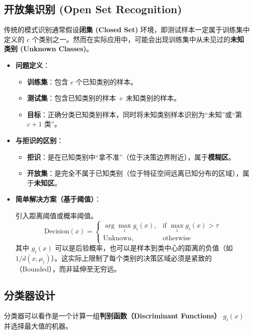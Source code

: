 \documentclass[a4paper, 11pt]{ctexart}
\begin{document}
\subsection{开放集识别 (Open Set Recognition)}
传统的模式识别通常假设\textbf{闭集 (Closed Set)} 环境，即测试样本一定属于训练集中定义的 $c$ 个类别之一。然而在实际应用中，可能会出现训练集中从未见过的\textbf{未知类别 (Unknown Classes)}。

\begin{itemize}
    \item \textbf{问题定义}：
    \begin{itemize}
        \item \textbf{训练集}：包含 $c$ 个已知类别的样本。
        \item \textbf{测试集}：包含已知类别的样本 + 未知类别的样本。
        \item \textbf{目标}：正确分类已知类别样本，同时将未知类别样本识别为“未知”或“第 $c+1$ 类”。
    \end{itemize}
    
    \item \textbf{与拒识的区别}：
    \begin{itemize}
        \item \textbf{拒识}：是在已知类别中“拿不准”（位于决策边界附近），属于\textbf{模糊区}。
        \item \textbf{开放集}：是完全不属于已知类别（位于特征空间远离已知分布的区域），属于\textbf{未知区}。
    \end{itemize}

    \item \textbf{简单解决方案（基于阈值）}：
    
    引入距离阈值或概率阈值。
    \begin{equation}
        \text{Decision}(x) = \begin{cases}
        \arg \max_i g_i(x), & \text{if } \max_i g_i(x) > \tau \\
        \text{Unknown}, & \text{otherwise}
        \end{cases}
    \end{equation}
    其中 $g_i(x)$ 可以是后验概率，也可以是样本到类中心的距离的负值（如 $1/d(x, \mu_i)$）。这实际上限制了每个类别的决策区域必须是紧致的（Bounded），而非延伸至无穷远。
\end{itemize}

\subsection{分类器设计}
分类器可以看作是一个计算一组\textbf{判别函数（Discriminant Functions）} $g_i(x)$ 并选择最大值的机器。
\end{document}
